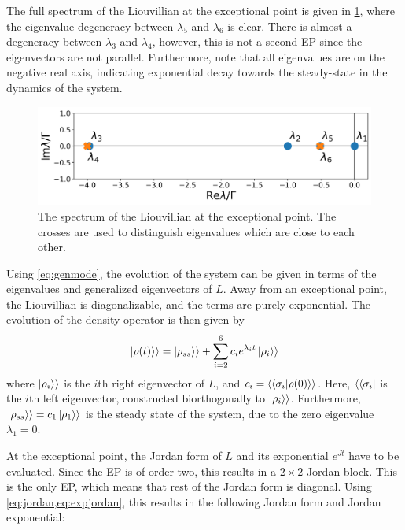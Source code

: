 \documentclass[../main.tex]{subfiles}
\begin{document}
The full spectrum of the Liouvillian at the exceptional point is given in \cref{fig:spec}, where the eigenvalue degeneracy between $\lambda_5$ and $\lambda_6$ is clear. There is almost a degeneracy between $\lambda_3$ and $\lambda_4$, however, this is not a second EP since the eigenvectors are not parallel. Furthermore, note that all eigenvalues are on the negative real axis, indicating exponential decay towards the steady-state in the dynamics of the system. 
\begin{figure}[H]
    \centering
    \includegraphics[width=0.8\linewidth]{figures/spectrum.png}
    \caption{The spectrum of the Liouvillian at the exceptional point. The crosses are used to distinguish eigenvalues which are close to each other.}
    \label{fig:spec}
\end{figure}

Using \cref{eq:genmode}, the evolution of the system can be given in terms of the eigenvalues and generalized eigenvectors of $L$. Away from an exceptional point, the Liouvillian is diagonalizable, and the terms are purely exponential. The evolution of the density operator is then given by
\begin{equation}\label{eq:dynnonep}
    \ket{\rho(t)}\rangle = \ket{\rho_{ss}}\rangle + \sum_{i=2}^6 c_i e^{\lambda_i t} \ket{\rho_i}\rangle
\end{equation}
where $\ket{\rho_i}\rangle$ is the $i$th right eigenvector of $L$, and $c_i = \langle\braket{\sigma_i|\rho(0)}\rangle$. Here, $\langle\bra{\sigma_i}$ is the $i$th left eigenvector, constructed biorthogonally to $\ket{\rho_i}\rangle$. Furthermore, $\ket{\rho_{ss}}\rangle = c_1 \ket{\rho_1}\rangle$ is the steady state of the system, due to the zero eigenvalue $\lambda_1=0$.

At the exceptional point, the Jordan form of $L$ and its exponential $e^{Jt}$ have to be evaluated. Since the EP is of order two, this results in a $2\times2$ Jordan block. This is the only EP, which means that rest of the Jordan form is diagonal. Using \cref{eq:jordan,eq:expjordan}, this results in the following Jordan form and Jordan exponential:
\end{document}
